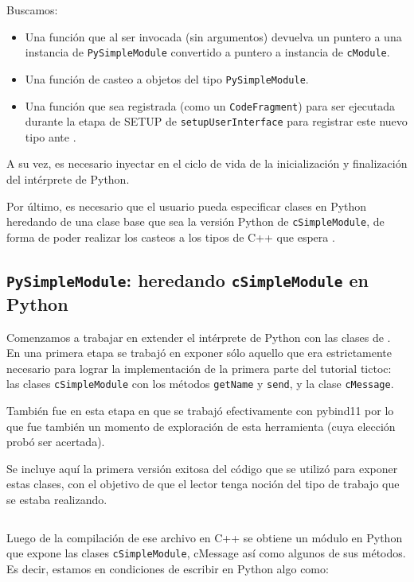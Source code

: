 Buscamos:

\begin{itemize}
    \item Una función que al ser invocada (sin argumentos) devuelva un puntero
a una instancia de \verb!PySimpleModule! convertido a puntero a instancia de
\verb!cModule!.

    \item Una función de casteo a objetos del tipo \verb!PySimpleModule!.

    \item Una función que sea registrada (como un \verb!CodeFragment!) para ser
ejecutada durante la etapa de SETUP de \verb!setupUserInterface! para registrar
este nuevo tipo ante \omnetpp{}. 

\end{itemize}

A su vez, es necesario inyectar en el ciclo de vida de \omnetpp{} la
inicialización y finalización del intérprete de Python.

Por último, es necesario que el usuario pueda especificar clases en Python
heredando de una clase base que sea la versión Python de \verb!cSimpleModule!,
de forma de poder realizar los casteos a los tipos de C++ que espera \omnetpp{}.

\subsection{\texttt{PySimpleModule}: heredando \texttt{cSimpleModule} en Python}

Comenzamos a trabajar en extender el intérprete de Python con las clases de
\omnetpp{}. En una primera etapa se trabajó en exponer sólo aquello que era
estrictamente necesario para lograr la implementación de la primera parte del
tutorial tictoc: las clases \verb!cSimpleModule! con los métodos
\verb!getName! y \verb!send!, y la clase \verb!cMessage!.

También fue en esta etapa en que se trabajó efectivamente con pybind11 por lo
que fue también un momento de exploración de esta herramienta (cuya elección
probó ser acertada).

Se incluye aquí la primera versión exitosa del código que se utilizó para
exponer estas clases, con el objetivo de que el lector tenga noción del tipo de
trabajo que se estaba realizando.

\inputminted{c++}{codelistings/binding.cc}

Luego de la compilación de ese archivo en C++ se obtiene un módulo en Python
que expone las clases \verb!cSimpleModule!, cMessage así como algunos de sus
métodos. Es decir, estamos en condiciones de escribir en Python algo como:

